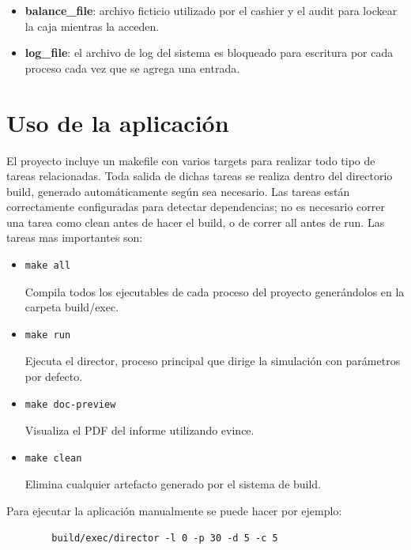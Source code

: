 \documentclass[a4paper,10pt]{article}
\begin{document}
\begin{itemize}
\item \textbf{balance\_file}: archivo ficticio utilizado por el cashier y el audit para lockear la caja mientras la acceden.
\item \textbf{log\_file}: el archivo de log del sistema es bloqueado para escritura por cada proceso cada vez que se agrega una entrada.
\end{itemize}


\section{Uso de la aplicación}

El proyecto incluye un makefile con varios targets para realizar todo tipo de tareas relacionadas. Toda salida de dichas tareas se realiza dentro del directorio build, generado automáticamente según sea necesario. Las tareas están correctamente configuradas para detectar dependencias; no es necesario correr una tarea como clean antes de hacer el build, o de correr all antes de run. Las tareas mas importantes son:

\begin{itemize}
\item
\begin{verbatim}
make all
\end{verbatim}
Compila todos los ejecutables de cada proceso del proyecto generándolos en la carpeta build/exec.

\item
\begin{verbatim}
make run
\end{verbatim}
Ejecuta el director, proceso principal que dirige la simulación con parámetros por defecto.

\item
\begin{verbatim}
make doc-preview
\end{verbatim}
Visualiza el PDF del informe utilizando evince.

\item
\begin{verbatim}
make clean
\end{verbatim}
Elimina cualquier artefacto generado por el sistema de build.
\end{itemize}


Para ejecutar la aplicación manualmente se puede hacer por ejemplo:

\begin{verbatim}
        build/exec/director -l 0 -p 30 -d 5 -c 5
\end{verbatim}
\end{document}
